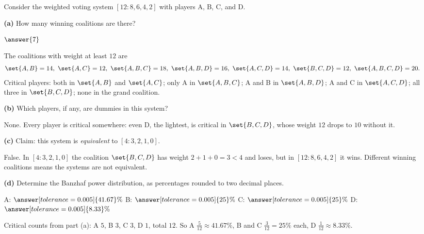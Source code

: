 \documentclass[12pt]{ximera}
\begin{document}
\begin{problem}
Consider the weighted voting system $[12:8,6,4,2]$ with players A, B, C, and D.

\begin{prompt}
\textbf{(a)} How many winning coalitions are there?

$\answer{7}$

\begin{feedback}
The coalitions with weight at least $12$ are
\[
\set{A,B}=14,\ \set{A,C}=12,\ \set{A,B,C}=18,\ \set{A,B,D}=16,\ \set{A,C,D}=14,\
\set{B,C,D}=12,\ \set{A,B,C,D}=20.
\]
Critical players: both in $\set{A,B}$ and $\set{A,C}$; only A in $\set{A,B,C}$; A and B
in $\set{A,B,D}$; A and C in $\set{A,C,D}$; all three in $\set{B,C,D}$; none in the
grand coalition.
\end{feedback}
\end{prompt}

\begin{prompt}
\textbf{(b)} Which players, if any, are dummies in this system?

\begin{selectAll}
\end{selectAll}

\begin{feedback}
None. Every player is critical somewhere: even D, the lightest, is critical in
$\set{B,C,D}$, whose weight $12$ drops to $10$ without it.
\end{feedback}
\end{prompt}

\begin{prompt}
\textbf{(c)} Claim: this system is \emph{equivalent} to $[4:3,2,1,0]$.

\begin{multipleChoice}
\end{multipleChoice}

\begin{feedback}
False. In $[4:3,2,1,0]$ the coalition $\set{B,C,D}$ has weight $2+1+0=3<4$ and loses,
but in $[12:8,6,4,2]$ it wins. Different winning coalitions means the systems are not
equivalent.
\end{feedback}
\end{prompt}

\begin{prompt}
\textbf{(d)} Determine the Banzhaf power distribution, as percentages rounded to two
decimal places.

A: $\answer[tolerance=0.005]{41.67}\%$ \quad B: $\answer[tolerance=0.005]{25}\%$ \quad
C: $\answer[tolerance=0.005]{25}\%$ \quad D: $\answer[tolerance=0.005]{8.33}\%$

\begin{feedback}
Critical counts from part (a): A $5$, B $3$, C $3$, D $1$, total $12$. So A
$\frac{5}{12}\approx 41.67\%$, B and C $\frac{3}{12}=25\%$ each, D $\frac1{12}\approx 8.33\%$.
\end{feedback}
\end{prompt}
\end{problem}
\end{document}
